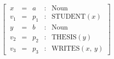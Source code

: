 \begin{equation}
    \begin{bmatrix}
        \ x & = & a & : & \text{Noun}\\
        \ v_{1} & = & p_{1} & : & \text{STUDENT}( x)\\
        \ y & = & b & : & \text{Noun}\\
        \ v_{2} & = & p_{2} & : & \text{THESIS}( y)\\
        \ v_{3} & = & p_{3} & : & \text{WRITES}( x,\ y)
    \end{bmatrix} 
\end{equation}